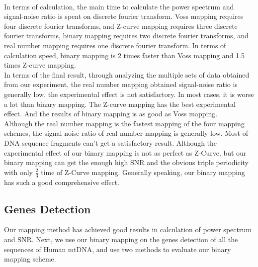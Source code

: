 \documentclass[conference]{IEEEtran}
\begin{document}
~\\\indent In terms of calculation, the main time to calculate the power spectrum and signal-noise ratio is spent on discrete fourier transform. Voss mapping requires four discrete fourier transforms, and Z-curve mapping requires three discrete fourier transforms, binary mapping requires two discrete fourier transforms, and real number mapping requires one discrete fourier transform. In terms of calculation speed, binary mapping is 2 times faster than Voss mapping and 1.5 times Z-curve mapping.
~\\\indent In terms of the final result, through analyzing the multiple sets of data obtained from our experiment, the real number mapping obtained signal-noise ratio is generally low, the experimental effect is not satisfactory. In most cases, it is worse a lot than binary mapping. The Z-curve mapping has the best experimental effect. And the results of binary mapping is as good as Voss mapping.
~\\\indent Although the real number mapping is the fastest mapping of the four mapping schemes, the signal-noise ratio of real number mapping is generally low. Most of DNA sequence fragments can't get a satisfactory result. Although the experimental effect of our binary mapping is not as perfect as Z-Curve, but our binary mapping can get the enough high SNR and the obvious triple periodicity with only $\frac{2}{3}$ time of Z-Curve mapping. Generally speaking, our binary mapping has such a good comprehensive effect.
\subsection{Genes Detection}
Our mapping method has achieved good results in calculation of power spectrum and SNR. Next, we use our binary mapping on the genes detection of all the sequences of Human mtDNA, and use two methods to evaluate our binary mapping scheme.
\end{document}
